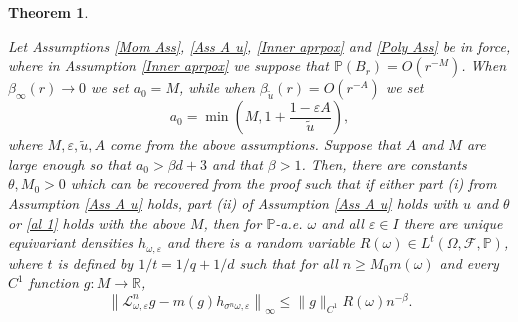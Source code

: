 \documentclass[11pt,reqno,a4paper]{article}
\newtheorem{theorem}{Theorem}
\theoremstyle{special}
\def\om{\omega}
\begin{document}
\begin{theorem}\label{OSC1}

Let  Assumptions \ref{Mom Ass}, \ref{Ass A u}, \ref{Inner aprpox} and \ref{Poly Ass} be in force, where in Assumption \ref{Inner aprpox} we suppose that $\mathbb P(B_r)=O(r^{-M})$. %
When  $\beta_\infty(r)\to 0$ we set $a_0=M$, while when  $\beta_{\tilde u}(r)=O(r^{-A})$ we set 
$$
a_0=\min\left(M,1+\frac{1-\varepsilon A}{\tilde u}\right),
$$
where $M,\varepsilon,\tilde u,A$  come from the above assumptions. 
Suppose that $A$  and $M$ are large enough so that $a_0>\beta d+3$ and that $\beta>1$.
Then, there  are constants $\theta,M_0>0$ which can be recovered from the proof such that 
if either  part (i)  from Assumption  \ref{Ass A u}  holds, part (ii) of Assumption  \ref{Ass A u}  holds with  $u$ and $\theta$ or  \eqref{al 1} holds with the above $M$, then for $\mathbb P$-a.e. $\om$ and all $\varepsilon\in I$ there are unique  equivariant densities $h_{\om, \varepsilon}$ and
there is a random variable $R(\om)\in L^t(\Omega,\mathcal F,\mathbb P)$, where $t$ is defined by $1/t=1/q+1/d$  
such that for  all  $n\geq M_0m(\omega)$  and every $C^1$ function $g: M\to\mathbb R$,
$$
\left\|\mathcal L_{\om, \varepsilon}^n g-m(g)h_{\sigma^n\omega, \varepsilon}\right\|_{\infty}\leq \|g\|_{C^1} R(\omega)n^{-\beta}.
$$
\end{theorem}
\end{document}
